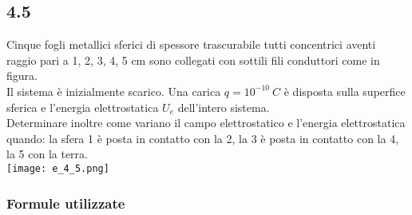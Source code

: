 \documentclass[../../main.tex]{subfiles}
\begin{document}
\subsection*{4.5}
Cinque fogli metallici sferici di spessore trascurabile tutti concentrici aventi raggio pari a 1, 2, 3, 4, 5 cm sono collegati con sottili fili conduttori come in figura.
\\Il sistema è inizialmente scarico. Una carica $q=10^{-10}\ C$ è disposta sulla superfice sferica e l'energia elettrostatica $U_e$ dell'intero sistema.
\\Determinare inoltre come variano il campo elettrostatico e l'energia elettrostatica quando: la sfera 1 è posta in contatto con la 2, la 3 è posta in contatto con la 4, la 5 con la terra.
\\\texttt{[image: e\_4\_5.png]}
\subsubsection*{Formule utilizzate}
\end{document}
